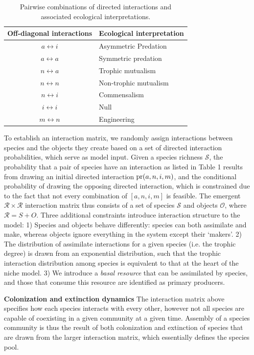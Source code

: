 \documentclass[twocolumn,preprintnumbers,amsmath,amssymb,superscriptaddress]{revtex4}
\begin{document}
\begin{table}[h]
  \begin{tabular}{ c  l }
    \hline
    Off-diagonal interactions & Ecological interpretation \\
    \hline
    $a \leftrightarrow i$ & Asymmetric Predation \\
    $a \leftrightarrow a$ & Symmetric predation \\
    $n \leftrightarrow a$ & Trophic mutualism \\
    $n \leftrightarrow n$ & Non-trophic mutualism \\
    $n \leftrightarrow i$ & Commensalism \\
    $i \leftrightarrow i$ & Null \\
    $m \leftrightarrow n$ & Engineering \\
    \hline
  \end{tabular}
  \caption{Pairwise combinations of directed interactions and associated ecological interpretations.}
\end{table}

To establish an interaction matrix, we randomly assign interactions between species and the objects they create based on a set of directed interaction probabilities, which serve as model input. 
Given a species richness $\mathcal S$, the probability that a pair of species have an interaction as listed in Table 1 results from drawing an initial directed interaction ${\rm pr}(a,n,i,m)$, and the conditional probability of drawing the opposing directed interaction, which is constrained due to the fact that not every combination of $[a,n,i,m]$ is feasible.
The emergent $\mathcal R \times \mathcal R$ interaction matrix thus consists of a set of species $\mathcal S$ and objects $\mathcal O$, where $\mathcal R = S + O$. 
Three additional constraints introduce interaction structure to the model:
1) Species and objects behave differently: species can both assimilate and make, whereas objects ignore everything in the system except their `makers'.
2) The distribution of assimilate interactions for a given species (i.e. the trophic degree) is drawn from an exponential distribution, such that the trophic interaction distribution among species is equivalent to that at the heart of the niche model.
3) We introduce a \emph{basal resource} that can be assimilated by species, and those that consume this resource are identified as primary producers.


{\bf Colonization and extinction dynamics}
The interaction matrix above specifies how each species interacts with every other, however not all species are capable of coexisting in a given community at a given time.
Assembly of a species community is thus the result of both colonization and extinction of species that are drawn from the larger interaction matrix, which essentially defines the species pool.
\end{document}
